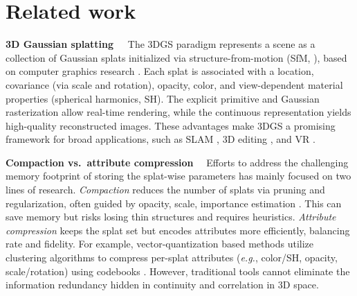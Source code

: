 \documentclass{article}
\newcommand{\eg}{\textit{e.g.}\xspace}
\renewcommand{\paragraph}[1]{\noindent\textbf{#1}~~}
\begin{document}
%

%
%
%
%
%
%








%
\section{Related work}
\label{sec:related}
\noindent\textbf{3D Gaussian splatting~~}
%
%
The 3DGS paradigm represents a scene as a collection of Gaussian splats initialized via structure-from-motion (SfM, \cite{schonberger2016sfm}), based on computer graphics research \cite{westover1991splatting,zwicker2002ewa}. Each splat is associated with a location, covariance (via scale and rotation), opacity, color, and view-dependent material properties (spherical harmonics, SH). The explicit primitive and Gaussian rasterization allow real-time rendering, while the continuous representation yields high-quality reconstructed images. These advantages make 3DGS a promising framework for broad applications, such as SLAM \cite{yan2024gsslam,keetha2024splatam,huang2024photoslam,hu2024cgslam}, 3D editing \cite{chen2024gaussianeditor,wu2024gaussctrl,shao2024control4d,zhuang2024tipeditor}, and VR \cite{tang2023dreamgaussian,zielonka2025drivable,jiang2024vr,zhang2024physdreamer}.

\paragraph{Compaction vs.\ attribute compression}
Efforts to address the challenging memory footprint of storing the splat-wise parameters has mainly focused on two lines of research. \emph{Compaction} reduces the number of splats via pruning and regularization, often guided by opacity, scale, importance estimation \cite{mallick2024taming3dgs,fang2024minisplatting,zhang2025gaussianspa,pateux2025bogauss,ren2024octree}. This can save memory but risks losing thin structures and requires heuristics. \emph{Attribute compression} keeps the splat set but encodes attributes more efficiently, balancing rate and fidelity. For example,  
vector-quantization \cite{van2017neural_vq,gersho2012vector,vali2023stochastic} based methods utilize clustering algorithms \cite{lloyd1982least,linde1980algorithm} to compress per-splat attributes (\eg, color/SH, opacity, scale/rotation) using codebooks \cite{navaneet2024compgs,lee2024compact3d,fan2024lightgaussian,papantonakis2024reducing3d,niedermayr2024compressed3d}.  
However, traditional tools cannot eliminate the information redundancy hidden in continuity and correlation in 3D space.
\end{document}
